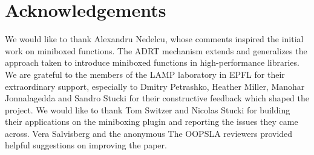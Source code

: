 \section*{Acknowledgements}

We would like to thank Alexandru Nedelcu, whose comments inspired the initial work on miniboxed functions. The ADRT mechanism extends and generalizes the approach taken to introduce miniboxed functions in high-performance libraries. We are grateful to the members of the LAMP laboratory in EPFL for their extraordinary support, especially to Dmitry Petrashko, Heather Miller, Manohar Jonnalagedda and Sandro Stucki for their constructive feedback which shaped the project. We would like to thank Tom Switzer and Nicolas Stucki for building their applications on the miniboxing plugin and reporting the issues they came across. Vera Salvisberg and the anonymous The OOPSLA reviewers provided helpful suggestions on improving the paper.